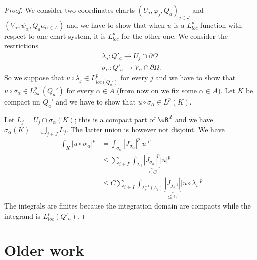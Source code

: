 \begin{proof}
    We consider two coordinates charts \( (U_j,\varphi_j,Q_a)_{j\in J}\) and \( (V_{\alpha},\psi_{\alpha},Q_aa_{\alpha\in A})\) and we have to show that when \( u\) is a \( L^p_{loc} \) function with respect to one chart system, it is \( L^p_{loc}\) for the other one. We consider the restrictions
    \begin{subequations}
        \begin{align}
            \lambda_j\colon Q'_a\to U_j\cap \partial\Omega\\
            \sigma_{\alpha}\colon Q'_a\to V_{\alpha}\cap\partial\Omega.
        \end{align}
    \end{subequations}
    So we suppose that \( u\circ\lambda_j\in L^p_{loc(Q_a')} \) for every \( j\) and we have to show that \( u\circ\sigma_{\alpha}\in L^p_{loc}(Q_a')\) for every \( \alpha\in A\) (from now on we fix some \( \alpha\in A\)). Let \( K\) be compact un \( Q_a'\) and we have to show that \( u\circ\sigma_{\alpha}\in L^p(K)\).

    Let \( L_j=U_j\cap\sigma_{\alpha}(K)\); this is a compact part of \( \eR^d\) and we have \( \sigma_{\alpha}(K)=\bigcup_{j\in J}L_j\). The latter union is however not disjoint. We have
    \begin{subequations}
        \begin{align}
            \int_K| u\circ\sigma_{\alpha} |^p&=\int_{\sigma_{\alpha}}| J_{\sigma_{\alpha}} |^p| u |^p\\
            &\leq \sum_{i\in I}\int_{L_j}\underbrace{| J_{\sigma_{\alpha}} |^p}_{\leq C}| u |^p\\
            &\leq C\sum_{i\in I}\int_{\lambda_i^{-1}(L_i)}\underbrace{| J_{\lambda_i^{-1}} |}_{\leq C'} |u\circ\lambda_i |^p
        \end{align}
    \end{subequations}
    The integrals are finites because the integration domain are compacts while the integrand is \( L^p_{loc}(Q'_a)\).
\end{proof}

\section{Older work}
\label{SECooNJLDooFcUzQv}

